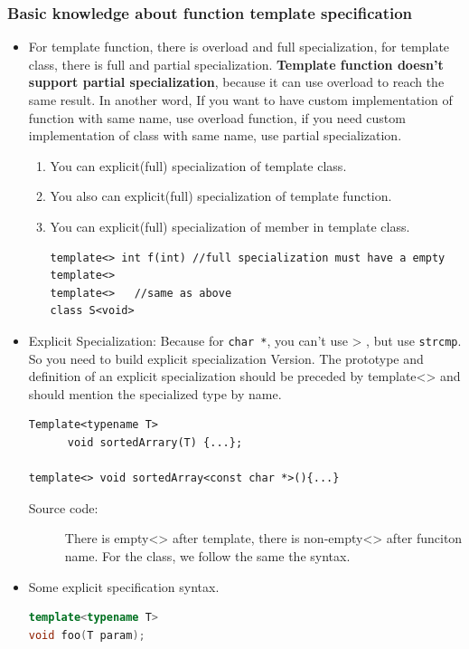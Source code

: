 \documentclass[a4paper,11pt,twoside]{book}
\begin{document}
\subsubsection{Basic knowledge about function template specification}
\begin{itemize}

    \item For template function, there is overload and full specialization, for template class, there is full and partial specialization. \textbf{Template function doesn't support partial specialization}, because it can use overload to reach the same result. In another word, If you want to have custom implementation of function with same name, use overload function, if you need  custom implementation of class with same name, use partial specialization.

    \begin{enumerate}
	\item You can explicit(full) specialization of template class. 
	\item You also can explicit(full) specialization of template function. 
	\item You can explicit(full) specialization of member in template class. 
\begin{lstlisting}
template<> int f(int) //full specialization must have a empty template<>
template<>   //same as above
class S<void>
\end{lstlisting}
	\end{enumerate}


    \item Explicit Specialization: Because for \texttt{char *}, you can't use > , but use \texttt{strcmp}.  So you need to build explicit specialization Version. The prototype and definition of an explicit specialization should be preceded by template<> and should mention the specialized type by name.
	
\begin{lstlisting}[numbers=none]
Template<typename T>
      void sortedArrary(T) {...};

template<> void sortedArray<const char *>(){...}
\end{lstlisting}
\begin{description}
	\item[Source code:] There is empty<> after template, there is non-empty<> after funciton name. For the class, we follow the same the syntax.
\end{description}

\item Some explicit specification syntax.
\begin{lstlisting}[frame=single, language=c++]
template<typename T>
void foo(T param);


\end{lstlisting}
\end{itemize}
\end{document}
